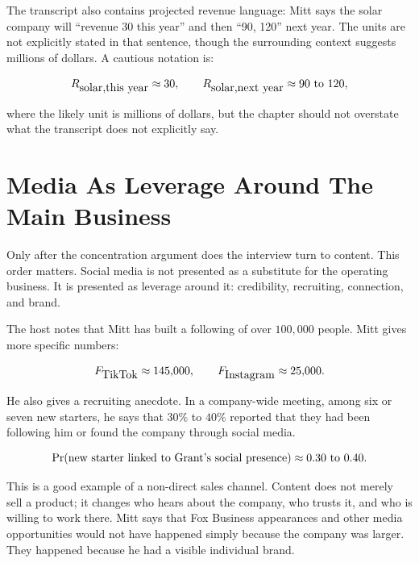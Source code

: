 The transcript also contains projected revenue language: Mitt says the solar company will ``revenue 30 this year'' and then ``90, 120'' next year. The units are not explicitly stated in that sentence, though the surrounding context suggests millions of dollars. A cautious notation is:

\begin{equation}
  R_{\hbox{solar,this year}} \approx 30,
  \qquad
  R_{\hbox{solar,next year}} \approx 90\hbox{ to }120,
\end{equation}

where the likely unit is millions of dollars, but the chapter should not overstate what the transcript does not explicitly say.

\section{Media As Leverage Around The Main Business}

Only after the concentration argument does the interview turn to content. This order matters. Social media is not presented as a substitute for the operating business. It is presented as leverage around it: credibility, recruiting, connection, and brand.

The host notes that Mitt has built a following of over \(100{,}000\) people. Mitt gives more specific numbers:

\begin{equation}
  F_{\hbox{TikTok}} \approx 145{,}000,
  \qquad
  F_{\hbox{Instagram}} \approx 25{,}000.
\end{equation}

He also gives a recruiting anecdote. In a company-wide meeting, among six or seven new starters, he says that \(30\%\) to \(40\%\) reported that they had been following him or found the company through social media.

\begin{equation}
  \Pr(\hbox{new starter linked to Grant's social presence})
  \approx 0.30 \hbox{ to } 0.40.
\end{equation}

This is a good example of a non-direct sales channel. Content does not merely sell a product; it changes who hears about the company, who trusts it, and who is willing to work there. Mitt says that Fox Business appearances and other media opportunities would not have happened simply because the company was larger. They happened because he had a visible individual brand.

